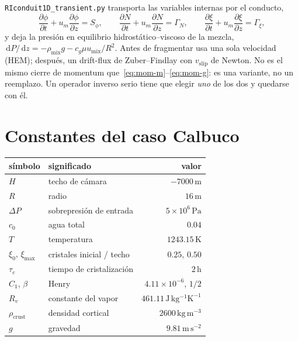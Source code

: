 \documentclass[11pt,a4paper]{article}
\newcommand{\dd}{\,\mathrm{d}}
\newcommand{\p}{\partial}
\newcommand{\Rv}{R_v}
\begin{document}
\texttt{RIconduit1D\_transient.py} transporta las variables internas
por el conducto,
\begin{equation}
\label{eq:trans}
\frac{\p\phi}{\p t}+u_m\frac{\p\phi}{\p z}=S_\phi,
\qquad
\frac{\p N}{\p t}+u_m\frac{\p N}{\p z}=\Gamma_N,
\qquad
\frac{\p\xi}{\p t}+u_m\frac{\p\xi}{\p z}=\Gamma_\xi,
\end{equation}
y deja la presión en equilibrio hidrostático--viscoso de la mezcla,
$\dd P/\dd z=-\rho_{\mathrm{mix}}g-c_g\mu u_{\mathrm{mix}}/R^2$. Antes
de fragmentar usa una sola velocidad (HEM); después, un drift-flux de
Zuber--Findlay con $v_{\mathrm{slip}}$ de Newton. No es el mismo
cierre de momentum que~\eqref{eq:mom-m}--\eqref{eq:mom-g}: es una
variante, no un reemplazo. Un operador inverso serio tiene que
elegir \emph{uno} de los dos y quedarse con él.

\section{Constantes del caso Calbuco}

\begin{center}
\small
\begin{tabular}{@{}llr@{}}
\toprule
símbolo & significado & valor \\
\midrule
$H$ & techo de cámara & $-7000\,\mathrm{m}$ \\
$R$ & radio & $16\,\mathrm{m}$ \\
$\Delta P$ & sobrepresión de entrada & $5\times10^6\,\mathrm{Pa}$ \\
$c_0$ & agua total & $0.04$ \\
$T$ & temperatura & $1243.15\,\mathrm{K}$ \\
$\xi_0$, $\xi_{\max}$ & cristales inicial / techo & $0.25$, $0.50$ \\
$\tau_c$ & tiempo de cristalización & $2\,\mathrm{h}$ \\
$C_1$, $\beta$ & Henry & $4.11\times10^{-6}$, $1/2$ \\
$\Rv$ & constante del vapor & $461.11\,\mathrm{J\,kg^{-1}K^{-1}}$ \\
$\rho_{\mathrm{crust}}$ & densidad cortical & $2600\,\mathrm{kg\,m^{-3}}$ \\
$g$ & gravedad & $9.81\,\mathrm{m\,s^{-2}}$ \\
\bottomrule
\end{tabular}
\end{center}
\end{document}
